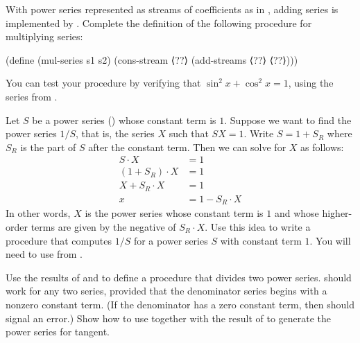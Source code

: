 \begin{exercise}
	\label{Exercise 3.60}
	With power series represented as streams of coefficients as in , adding series is implemented by .
	Complete the definition of the following procedure for multiplying series:
	\begin{scheme}
	  (define (mul-series s1 s2)
	    (cons-stream ⟨??⟩ (add-streams ⟨??⟩ ⟨??⟩)))
	\end{scheme}
	You can test your procedure by verifying that \( \sin^2 x + \cos^2 x = 1 \), using the series from .
\end{exercise}



\begin{exercise}
	\label{Exercise 3.61}
	Let \( S \) be a power series () whose constant term is \( 1 \).
	Suppose we want to find the power series \( 1 / S \), that is, the series \( X \) such that \( S X = 1 \).
	Write \( S = 1 + S_R \) where \( S_R \) is the part of \( S \) after the constant term.
	Then we can solve for \( X \) as follows:
	\begin{align*}
		        S ⋅ X &= 1 \\
		(1 + S_R) ⋅ X &= 1 \\
		  X + S_R ⋅ X &= 1 \\
		            x &= 1 - S_R ⋅ X
	\end{align*}
	In other words, \( X \) is the power series whose constant term is \( 1 \) and whose higher-order terms are given by the negative of \( S_R ⋅ X \).
	Use this idea to write a procedure  that computes \( 1 / S \) for a power series \( S \) with constant term \( 1 \).
	You will need to use  from .
\end{exercise}



\begin{exercise}
	\label{Exercise 3.62}
	Use the results of  and  to define a procedure  that divides two power series.
	 should work for any two series, provided that the denominator series begins with a nonzero constant term.
	(If the denominator has a zero constant term, then  should signal an error.)
	Show how to use  together with the result of  to generate the power series for tangent.
\end{exercise}




